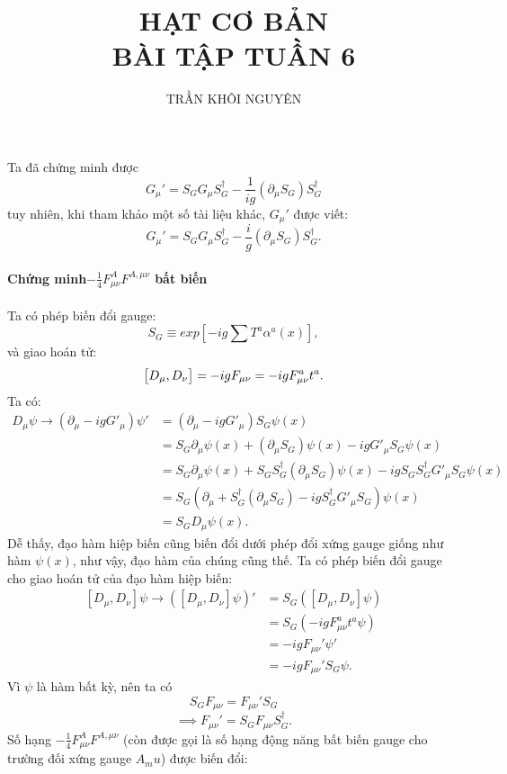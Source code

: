 \documentclass[14Pt]{report}
\title{\Huge{HẠT CƠ BẢN \\ BÀI TẬP TUẦN 6}}
\begin{document}
	\author{TRẦN KHÔI NGUYÊN}
	
	\maketitle

	\noindent Ta đã chứng minh được $$G_\mu'=S_G G_\mu S_G^\dagger-\frac{1}{ig}(\partial_\mu S_G) S_G^\dagger$$
	tuy nhiên, khi tham khảo một số tài liệu khác, $G_\mu'$ được viết:$$G_\mu'=S_G G_\mu S_G^\dagger-\frac{i}{g}(\partial_\mu S_G) S_G^\dagger.$$
	\\
	\textbf{Chứng minh$-\frac{1}{4}F_{\mu\nu}^A F^{A,\mu\nu}$ bất biến} \\
	\\
	Ta có phép biến đổi gauge: $$S_G\equiv exp\left[-ig\sum T^a\alpha^a(x)\right],$$
	và giao hoán tử:
	\begin{equation}
		\left[D_\mu,D_\nu\right]=-igF_{\mu\nu}=-igF_{\mu\nu}^at^a.\\
	\end{equation}
	Ta có: 
	\begin{align}
	D_\mu\psi \rightarrow (\partial_\mu-igG'_\mu)\psi'&=(\partial_\mu-igG'_\mu)S_G\psi(x)\nonumber\\
	&=S_G\partial_\mu\psi(x)+(\partial_\mu S_G)\psi(x)-igG'_\mu S_G\psi(x) \nonumber\\
	&=S_G\partial_\mu\psi(x)+S_GS_G^\dagger(\partial_\mu S_G)\psi(x)-igS_GS_G^\dagger G'_\mu S_G\psi(x)\nonumber\\
	&=S_G\left(\partial_\mu+S_G^\dagger(\partial_\mu S_G)-igS_G^\dagger G'_\mu S_G\right)\psi(x)\nonumber\\
	&=S_GD_\mu\psi(x).
	\end{align}
	Dễ thấy, đạo hàm hiệp biến cũng biến đổi dưới phép đổi xứng gauge giống như hàm $\psi(x)$, như vậy, đạo hàm của chúng cũng thế.
	Ta có phép biến đổi gauge cho giao hoán tử của đạo hàm hiệp biến:
	\begin{align}
		\left[D_\mu,D_\nu\right]\psi\rightarrow (\left[D_\mu,D_\nu\right]\psi)'&=S_G(\left[D_\mu,D_\nu\right]\psi) \nonumber\\
		&=S_G(-igF_{\mu\nu}^at^a\psi)\nonumber\\
		&=-igF_{\mu\nu}'\psi'\nonumber\\
		&=-igF_{\mu\nu}'S_G\psi.
	\end{align}
	Vì $\psi$ là hàm bất kỳ, nên ta có
	$$S_GF_{\mu\nu}=F_{\mu\nu}'S_G$$
	$$\implies F_{\mu\nu}'=S_GF_{\mu\nu}S_G^\dagger.$$
	Số hạng $-\frac{1}{4}F_{\mu\nu}^AF^{A,\mu\nu}$ (còn được gọi là số hạng động năng bất biến gauge cho trường đối xứng gauge $A_mu$) được biến đổi:
\end{document}
